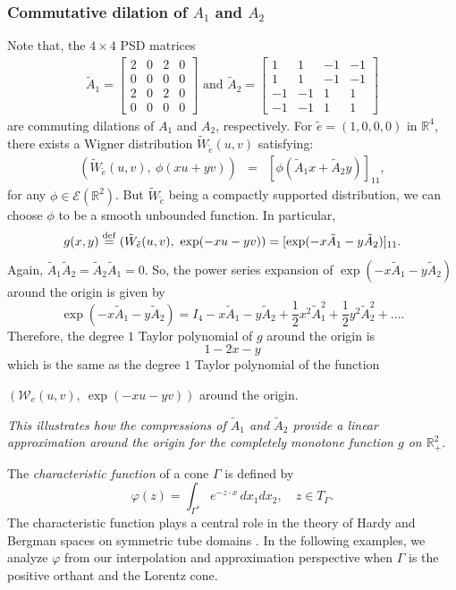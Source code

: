 \documentclass[11pt,reqno]{amsart}
\theoremstyle{plain}
\theoremstyle{definition}
\numberwithin{equation}{section}
\newcommand{\beas}{\begin{eqnarray*}}
\newcommand{\eeas}{\end{eqnarray*}}
\newcommand{\bydef}{\stackrel{\rm def}{=}}
\begin{document}
\subsubsection{Commutative dilation of $A_1$ and $A_2$} 
Note that, the $4 \times 4$ PSD matrices
\begin{align*}
  \tilde{A}_1 = \begin{bmatrix}
      2 & 0 & 2 & 0 \\ 0 & 0 & 0 & 0\\ 2 & 0 & 2 & 0 \\ 0 & 0 & 0 & 0
  \end{bmatrix} \text{ and } \tilde{A}_2 =  \begin{bmatrix}
      1 & 1 & -1 & -1 \\ 1 & 1 & -1 & -1\\ -1 & -1 & 1 & 1 \\ -1 & -1 & 1 & 1
  \end{bmatrix}
\end{align*}
are commuting dilations of $A_1$ and $A_2$, respectively. For $\tilde{e} = (1, 0, 0, 0)$ in $\mathbb{R}^4$, there exists a Wigner distribution $\tilde{W}_{\tilde{e}}(u,v)$ satisfying:
\beas 
( \tilde{W}_{\tilde{e}}(u, v), \ \phi(xu+yv) ) &=& [\phi(\tilde{A}_1 x + \tilde{A}_2 y)]_{11},
\eeas
for any $\phi \in \mathcal E({\mathbb R}^2)$. But $\tilde{W}_{\tilde{e}}$ being a compactly supported distribution, we can choose $\phi$ to be a smooth unbounded function. In particular, 
$$
g(x, y) \bydef ( \tilde{W}_{\tilde{e}}(u, v),\  \exp(-xu -yv) )= [\exp(-x\tilde{A}_1 - y \tilde{A}_2)]_{11}.
$$
Again, $\tilde{A}_1 \tilde{A}_2 = \tilde{A}_2 \tilde{A}_1 =0$. So, the power series expansion of $\exp(-x\tilde{A}_1 - y \tilde{A}_2)$ around the origin is given by
$$
\exp(-x\tilde{A}_1 - y \tilde{A}_2) = I_4 -x\tilde{A}_1 - y \tilde{A}_2 + \frac{1}{2} x^2 \tilde{A}_1^2 + \frac{1}{2} y^2 \tilde{A}_2^2 + \dots.
$$
Therefore, the degree $1$ Taylor polynomial of $g$ around the origin is $$1-2x - y$$ which is the same as the degree $1$ Taylor polynomial of the function 

\noindent $( \mathcal{W}_e(u, v),\  \exp(-xu -yv) )$ around the origin. 

{\em This illustrates how the compressions of $\tilde{A}_1$ and $\tilde{A}_2$ provide a linear approximation around the origin for the completely monotone function $g$ on $\mathbb{R}^2_+$}.

\bigskip

The \emph{characteristic function} of a cone $\Gamma$ is defined by
$$\varphi(z) = \int_{\Gamma^\ast} e^{-z\cdot x} \, dx_1 dx_2, \quad z \in T_\Gamma.$$
The characteristic function plays a central role in the theory of Hardy and Bergman spaces on symmetric tube domains \cite[Chapter I]{Faraut-Koranyi}. In the following examples, we analyze $\varphi$ from our interpolation and approximation perspective when $\Gamma$ is the positive orthant and the Lorentz cone.
\end{document}
